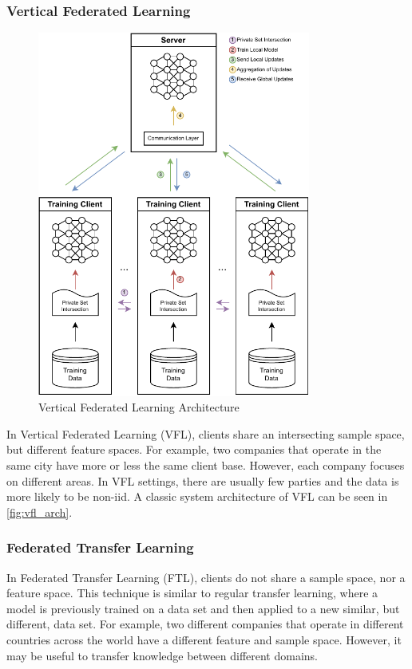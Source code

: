 \subsubsection{Vertical Federated Learning}

\begin{figure}[!ht]
    \centering
    \centering
    \includegraphics[width=0.8\textwidth]{graphics/vfl-architecture.pdf}
    \caption{Vertical Federated Learning Architecture}
    \label{fig:vfl_arch}
\end{figure}

In Vertical Federated Learning (VFL), clients share an intersecting sample space, but different feature spaces. For example, two companies that operate in the same city have more or less the same client base. However, each company focuses on different areas. In VFL settings, there are usually few parties and the data is more likely to be non-iid. A classic system architecture of VFL can be seen in \autoref{fig:vfl_arch}.

\subsubsection{Federated Transfer Learning}

In Federated Transfer Learning (FTL), clients do not share a sample space, nor a feature space. This technique is similar to regular transfer learning, where a model is previously trained on a data set and then applied to a new similar, but different, data set. For example, two different companies that operate in different countries across the world have a different feature and sample space. However, it may be useful to transfer knowledge between different domains.

